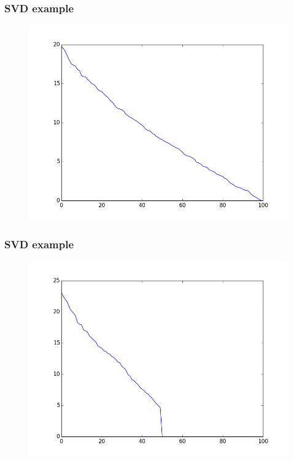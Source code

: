 \documentclass{beamer}
\begin{document}
\begin{frame}
\frametitle{SVD example}


\begin{figure}
\includegraphics[scale=0.25]{figs/svd_plot.png}
\end{figure}

\end{frame}

\begin{frame}
\frametitle{SVD example}


\begin{figure}
\includegraphics[scale=0.2]{figs/svd_lowrank.png}
\end{figure}


\end{frame}
\end{document}
